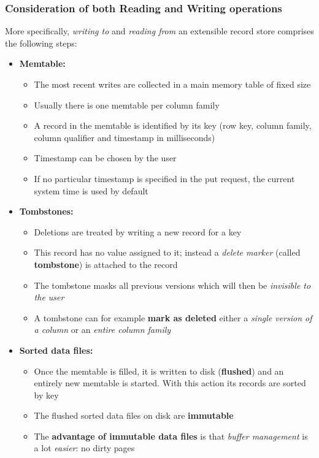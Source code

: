 \newpage
\subsubsection{Consideration of both Reading and Writing operations}
More specifically, \textit{writing to} and \textit{reading from} an extensible record store comprises the following steps:
\begin{itemize}
    \item \textbf{Memtable:} 
    \begin{itemize}
        \item The most recent writes are collected in a main memory table of fixed size
        \item Usually there is one memtable per column family
        \item A record in the memtable is identified by its key (row key, column family, column qualifier and timestamp in milliseconds)
        \item Timestamp can be chosen by the user
        \item If no particular timestamp is specified in the put request, the current system time is used by default
    \end{itemize}
    \item \textbf{Tombstones:} 
    \begin{itemize}
        \item Deletions are treated by writing a new record for a key
        \item This record has no value assigned to it; instead a \textit{delete marker} (called \textbf{tombstone}) is attached to the record
        \item The tombstone masks all previous versions which will then be \textit{invisible to the user}
        \item A tombstone can for example \textbf{mark as deleted} either a \textit{single version of a column} or an \textit{entire column family}
    \end{itemize}
    \item \textbf{Sorted data files:} 
    \begin{itemize}
        \item Once the memtable is filled, it is written to disk (\textbf{flushed}) and an entirely new memtable is started. With this action its records are sorted by key
        \item The flushed sorted data files on disk are \textbf{immutable}
        \item The \textbf{advantage of immutable data files} is that \textit{buffer management} is a lot \textit{easier}: no dirty pages

\end{itemize}
\end{itemize}
